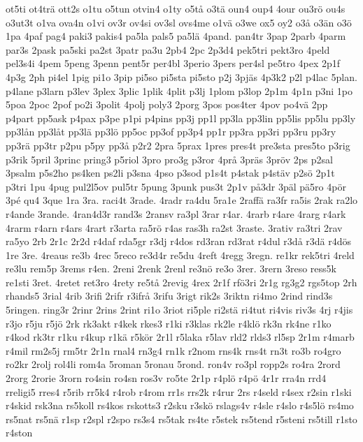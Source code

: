 {{ot5ti
ot4tr^^e4
ott2s
o1tu
o5tun
otvin4
o1ty
o5t^^e5
o3t^^e4
oun4
oup4
4our
ou3r^^f6
ou4s
o3ut3t
o1va
ova4n
o1vi
ov3r
ov4si
ov3sl
ovs4me
o1v^^e4
o3we
ox5
oy2
o3^^e5
o3^^e4n
o3^^f6
1pa
4paf
pag4
paki3
pakis4
pa5la
pals5
pa5l^^e4
4pand.
pan4tr
3pap
2parb
4parm
par3s
2pask
pa5ski
pa2st
3patr
pa3u
2pb4
2pc
2p3d4
pek5tri
pekt3ro
4peld
pel3s4i
4pem
5peng
3penn
pent5r
per4bl
3perio
3pers
per4sl
pe5tro
4pex
2p1f
4p3g
2ph
pi4el
1pig
pi1o
3pip
pi5so
pi5sta
pi5sto
p2j
3pj^^e4s
4p3k2
p2l
p4lac
5plan.
p4lane
p3larn
p3lev
3plex
3plic
1plik
4plit
p3lj
1plom
p3lop
2p1m
4p1n
p3ni
1po
5poa
2poc
2pof
po2i
3polit
4polj
poly3
2porg
3pos
pos4ter
4pov
po4v^^e4
2pp
p4part
pp5ask
p4pax
p3pe
p1pi
p4pins
pp3j
pp1l
pp3la
pp3lin
pp5lis
pp5lu
pp3ly
pp3l^^e5n
pp3l^^e5t
pp3l^^e4
pp3l^^f6
pp5oc
pp3of
pp3p4
pp1r
pp3ra
pp3ri
pp3ru
pp3ry
pp3r^^e4
pp3tr
p2pu
p5py
pp3^^e5
p2r2
2pra
5prax
1pres
pres4t
pre3sta
pres5to
p3rig
p3rik
5pril
3princ
pring3
p5riol
3pro
pro3g
p3ror
4pr^^e5
3pr^^e4s
3pr^^f6v
2ps
p2sal
3psalm
p5s2ho
ps4ken
ps2li
p3sna
4pso
p3sod
p1s4t
p4stak
p4st^^e4v
p2s^^f6
2p1t
p3tri
1pu
4pug
pul2l5ov
pul5tr
5pung
3punk
pus3t
2p1v
p^^e53dr
3p^^e4l
p^^e45ro
4p^^f6r
3p^^e9
qu4
3que
1ra
3ra.
raci4t
3rade.
4radr
ra4du
5ra1e
2raff^^e4
ra3fr
ra5is
2rak
ra2lo
r4ande
3rande.
4ran4d3r
rand3s
2ransv
ra3pl
3rar
r4ar.
4rarb
r4are
4rarg
r4ark
4rarm
r4arn
r4ars
4rart
r3arta
ra5r^^f6
r4as
ras3h
ra2st
3raste.
3rativ
ra3tri
2rav
ra5yo
2rb
2r1c
2r2d
r4daf
rda5gr
r3dj
r4dos
rd3ran
rd3rat
r4dul
r3d^^e5
r3d^^e4
r4d^^f6s
1re
3re.
4reaus
re3b
4rec
5reco
re3d4r
re5du
4reft
4regg
3regn.
re1kr
rek5tri
4reld
re3lu
rem5p
3rems
r4en.
2reni
2renk
2renl
re3n^^f6
re3o
3rer.
3rern
3reso
ress5k
re1sti
3ret.
4retet
ret3ro
4rety
re5t^^e5
2revig
4rex
2r1f
rf^^f63ri
2r1g
rg3g2
rgs5top
2rh
rhands5
3rial
4rib
3rifi
2rifr
r3ifr^^e5
3rifu
3rigt
rik2s
3riktn
ri4mo
2rind
rind3s
5ringen.
ring3r
2rinr
2rins
2rint
ri1o
3riot
ri5ple
ri2st^^e4
ri4tut
ri4vis
riv3s
4rj
r4jis
r3jo
r5ju
r5j^^f6
2rk
rk3akt
r4kek
rkes3
r1ki
r3klas
rk2le
r4kl^^f6
rk3n
rk4ne
r1ko
r4kod
rk3tr
r1ku
r4kup
r1k^^e4
r5k^^f6r
2r1l
r5laka
r5lav
rld2
rlds3
rl5sp
2r1m
r4marb
r4mil
rm2s5j
rm5tr
2r1n
rnal4
rn3g4
rn1k
r2nom
rns4k
rns4t
rn3t
ro3b
ro4gro
ro2kr
2rolj
rol4li
rom4a
5roman
5ronau
5rond.
ron4v
ro3pl
ropp2s
ro4ra
2rord
2rorg
2rorie
3rorn
ro4sin
ro4sn
ros3v
ro5te
2r1p
r4pl^^f6
r4p^^f6
4r1r
rra4n
rrd4
rreligi5
rres4
r5rib
rr5k4
r4rob
r4rom
rr1s
rrs2k
r4rur
2rs
r4seld
r4sex
r2sin
r1ski
r4skid
rsk3na
rs5koll
rs4kos
rskotts3
r2sku
r3sk^^f6
rslags4v
r4sle
r4slo
r4s5l^^f6
rs4mo
rs5nat
rs5n^^e4
r1sp
r2spl
r2spo
rs3s4
rs5tak
rs4te
r5stek
rs5tend
r5steni
rs5till
r1sto
r4ston
}}
